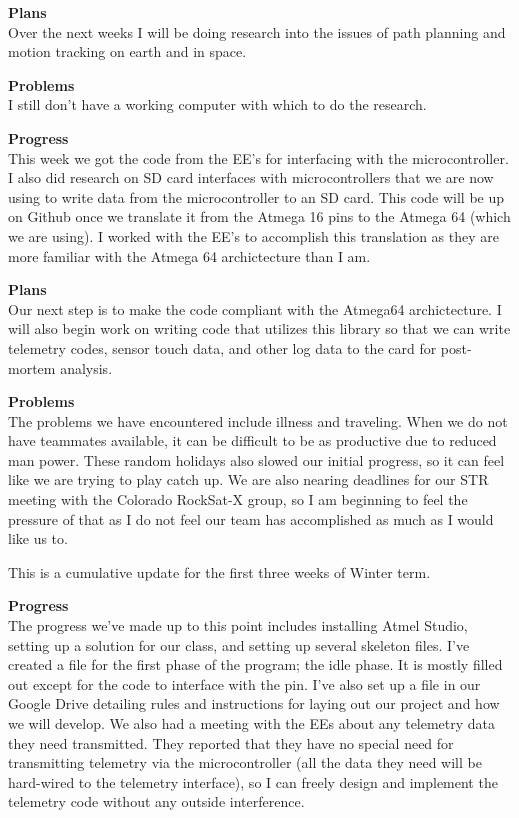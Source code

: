 \textbf{Plans} \\ 
Over the next weeks I will be doing research into the issues of path planning and motion tracking on earth and in space.

\textbf{Problems} \\ 
I still don't have a working computer with which to do the research.

\textbf{Progress} \\ 
This week we got the code from the EE's for interfacing with the microcontroller. I also did research on SD card 
interfaces with microcontrollers that we are now using to write data from the microcontroller to an SD card. This 
code will be up on Github once we translate it from the Atmega 16 pins to the Atmega 64 (which we are using). I worked
with the EE's to accomplish this translation as they are more familiar with the Atmega 64 archictecture than I am.

\textbf{Plans} \\ 
Our next step is to make the code compliant with the Atmega64 archictecture. I will also begin work on writing code
that utilizes this library so that we can write telemetry codes, sensor touch data, and other log data to the card
for post-mortem analysis.

\textbf{Problems} \\ 
The problems we have encountered include illness and traveling. When we do not have teammates available, it can be
difficult to be as productive due to reduced man power. These random holidays also slowed our initial progress, so
it can feel like we are trying to play catch up. We are also nearing deadlines for our STR meeting with the Colorado
RockSat-X group, so I am beginning to feel the pressure of that as I do not feel our team has accomplished as much
as I would like us to.

This is a cumulative update for the first three weeks of Winter term.

\textbf{Progress} \\
The progress we've made up to this point includes installing Atmel Studio, 
setting up a solution for our class, and setting up several skeleton files. 
I've created a file for the first phase of the program; the idle phase. It is 
mostly filled out except for the code to interface with the pin. I've also set
up a file in our Google Drive detailing rules and instructions for laying out 
our project and how we will develop. We also had a meeting with the EEs about 
any telemetry data they need transmitted. They reported that they have no 
special need for transmitting telemetry via the microcontroller (all the data 
they need will be hard-wired to the telemetry interface), so I can freely 
design and implement the telemetry code without any outside interference.

